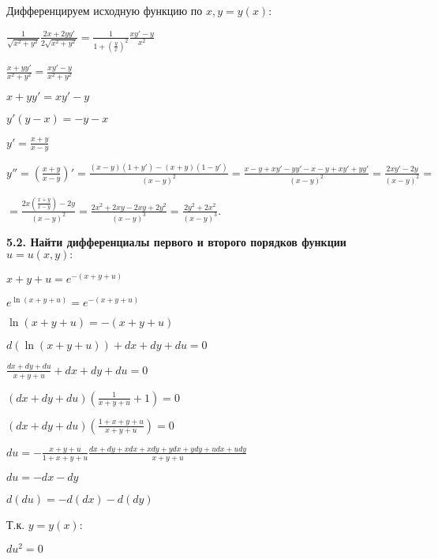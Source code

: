 \documentclass{article}
\begin{document}
\noindent Дифференцируем исходную функцию по $x, y = y(x)$:\vspace{1mm}

\noindent$\frac{1}{\sqrt{x^2+y^2}}\frac{2x+2yy'}{2\sqrt{x^2+y^2}}=\frac{1}{1+(\frac{y}{x})^2}\frac{xy'-y}{x^2}$\vspace{1mm}

\noindent$\frac{x+yy'}{x^2+y^2}=\frac{xy'-y}{x^2 + y^2}$\vspace{1mm}

\noindent$x+yy'=xy'-y$\vspace{1mm}

\noindent$y'(y-x)=-y-x$\vspace{1mm}

\noindent$y'=\frac{x+y}{x-y}$\vspace{1mm}

\noindent$y''=(\frac{x+y}{x-y})' = \frac{(x-y)(1+y')-(x+y)(1-y')}{(x-y)^2} = \frac{x-y+xy'-yy'-x-y+xy'+yy'}{(x-y)^2}=\frac{2xy'-2y}{(x-y)^2}=$\vspace{1mm}

\noindent$= \frac{2x(\frac{x+y}{x-y})-2y}{(x-y)^2} =\frac{2x^2+2xy-2xy+2y^2}{(x-y)^3} =\frac{2y^2+2x^2}{(x-y)^3}$.\vspace{3mm}

\noindent \textbf{5.2. Найти дифференциалы первого и второго порядков функции $u = u(x, y):$}\vspace{1mm}

\noindent$x+y+u = e^{-(x+y+u)}$\vspace{1mm}

\noindent$e^{\ln{(x+y+u)}} = e^{-(x+y+u)}$\vspace{1mm}

\noindent$\ln{(x+y+u)} = -(x+y+u)$\vspace{1mm}

\noindent$d(\ln{(x+y+u)}) +dx+dy+du = 0$\vspace{1mm}

\noindent$\frac{dx+dy+du}{x+y+u} +dx+dy+du = 0$\vspace{1mm}

\noindent$(dx+dy+du)(\frac{1}{x+y+u} +1) = 0$\vspace{1mm}

\noindent$(dx+dy+du)(\frac{1+x+y+u}{x+y+u}) = 0$\vspace{1mm}

\noindent$du = -\frac{x+y+u}{1+x+y+u}\frac{dx+dy+xdx+xdy+ydx+ydy+udx+udy}{x+y+u}$\vspace{1mm}

\noindent$du = -dx-dy$\vspace{1mm}

\noindent$d(du) = -d(dx)-d(dy)$\vspace{1mm}

\noindent Т.к. $y=y(x)$: 

\noindent$du^2 = 0$
\end{document}
